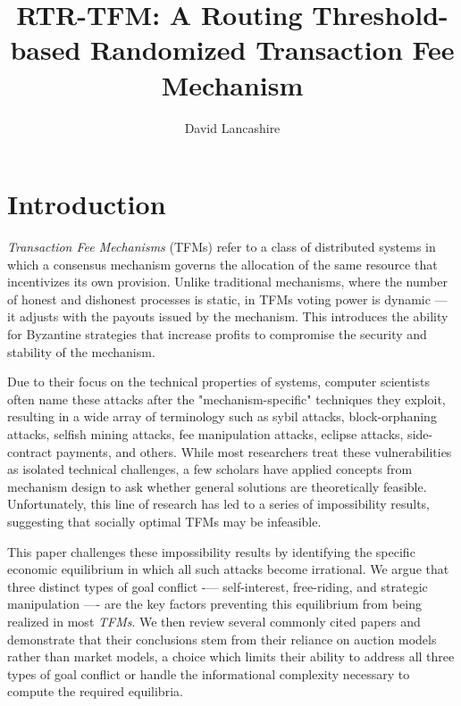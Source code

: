 \documentclass[sigconf,anonymous]{aamas}
\title[Routing Threshold-based Randomized Transaction Fee Mechanism]{RTR-TFM: A Routing Threshold-based Randomized Transaction Fee Mechanism}
\author{David Lancashire}
\affiliation{
  \institution{Proclus Technologies}
  \city{Bangkok}
  \country{Thailand}}
\begin{document}
\pagestyle{fancy}
\fancyhead{}

\maketitle 

\section{Introduction \label{sec::introduction}}

\emph{Transaction Fee Mechanisms} (TFMs) refer to a class of distributed systems in which a consensus mechanism governs the allocation of the same resource that incentivizes its own provision. Unlike traditional mechanisms, where the number of honest and dishonest processes is static, in TFMs voting power is dynamic — it adjusts with the payouts issued by the mechanism. This introduces the ability for Byzantine strategies that increase profits to compromise the security and stability of the mechanism.

Due to their focus on the technical properties of systems, computer scientists often name these attacks after the "mechanism-specific" techniques they exploit, resulting in a wide array of terminology such as sybil attacks, block-orphaning attacks, selfish mining attacks, fee manipulation attacks, eclipse attacks, side-contract payments, and others. While most researchers treat these vulnerabilities as isolated technical challenges, a few scholars have applied concepts from mechanism design to ask whether general solutions are theoretically feasible. Unfortunately, this line of research has led to a series of impossibility results, suggesting that socially optimal TFMs may be infeasible.

This paper challenges these impossibility results by identifying the specific economic equilibrium in which all such attacks become irrational. We argue that three distinct types of goal conflict -— self-interest, free-riding, and strategic manipulation —- are the key factors preventing this equilibrium from being realized in most \textit{TFMs}. We then review several commonly cited papers and demonstrate that their conclusions stem from their reliance on auction models rather than market models, a choice which limits their ability to address all three types of goal conflict or handle the informational complexity necessary to compute the required equilibria.
\end{document}
